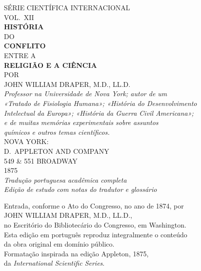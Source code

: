 \documentclass[11pt,a5paper,twoside,openany]{book}
\begin{document}
\begin{titlepage}
\centering
\vspace*{1.5cm}
{\small SÉRIE CIENTÍFICA INTERNACIONAL}\\[4pt]
{\small VOL.\ XII}\\[2cm]
{\LARGE\bfseries HISTÓRIA}\\[8pt]
{\large DO}\\[8pt]
{\LARGE\bfseries CONFLITO}\\[8pt]
{\large ENTRE A}\\[8pt]
{\LARGE\bfseries RELIGIÃO E A CIÊNCIA}\\[2.5cm]
{\large POR}\\[12pt]
{\Large JOHN WILLIAM DRAPER, M.D., LL.D.}\\[18pt]
{\small\itshape Professor na Universidade de Nova York; autor de um}\\
{\small\itshape «Tratado de Fisiologia Humana»; «História do Desenvolvimento}\\
{\small\itshape Intelectual da Europa»; «História da Guerra Civil Americana»;}\\
{\small\itshape e de muitas memórias experimentais sobre assuntos}\\
{\small\itshape químicos e outros temas científicos.}\\[2.5cm]
{\normalsize NOVA YORK:}\\[4pt]
{\normalsize D.\ APPLETON AND COMPANY}\\[2pt]
{\small 549 \& 551 BROADWAY}\\[8pt]
{\normalsize 1875}\\[1.5cm]
{\footnotesize\textit{Tradução portuguesa acadêmica completa}}\\
{\footnotesize\textit{Edição de estudo com notas do tradutor e glossário}}
\end{titlepage}

\thispagestyle{empty}
\vspace*{3cm}
\begin{center}
{\small Entrada, conforme o Ato do Congresso, no ano de 1874, por}\\[6pt]
{\small JOHN WILLIAM DRAPER, M.D., LL.D.,}\\[6pt]
{\small no Escritório do Bibliotecário do Congresso, em Washington.}\\[2cm]
{\small Esta edição em português reproduz integralmente o conteúdo}\\
{\small da obra original em domínio público.}\\[1cm]
{\small Formatação inspirada na edição Appleton, 1875,}\\
{\small da \textit{International Scientific Series}.}
\end{center}
\newpage
\end{document}

